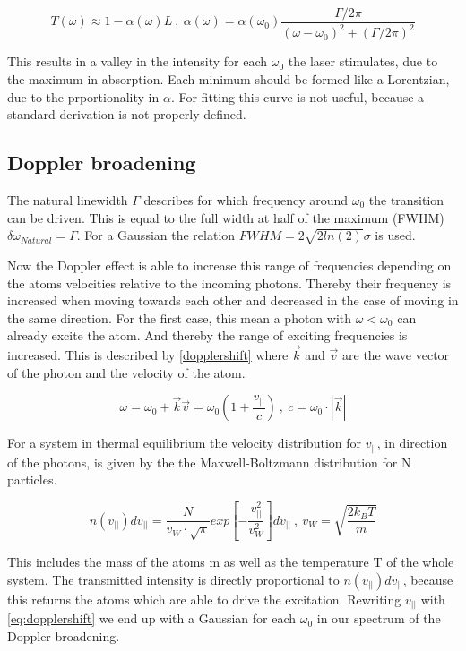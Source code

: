\documentclass[]{article}
\begin{document}
\begin{equation}
T(\omega)\approx 1-\alpha(\omega)L \:,\: \alpha(\omega)= \alpha(\omega_0)\frac{\Gamma/2\pi}{(\omega-\omega_0)^2 + (\Gamma/2\pi)^2}
\end{equation}

This results in a valley in the intensity for each $\omega_0$ the laser stimulates, due to the maximum in absorption. Each minimum should be formed like a Lorentzian, due to the prportionality in $\alpha$. For fitting this curve is not useful, because a standard derivation is not properly defined. 

\subsection{Doppler broadening}
The natural linewidth $\Gamma$ describes for which frequency around $\omega_0$ the transition can be driven. This is equal to the full width at half of the maximum (FWHM) $\delta\omega_{Natural} = \Gamma$. For a Gaussian the relation $FWHM = 2 \sqrt{2ln(2)} \sigma$ is used.

Now the Doppler effect is able to increase this range of frequencies depending on the atoms velocities relative to the incoming photons. Thereby their frequency is increased when moving towards each other and decreased in the case of moving in the same direction. For the first case, this mean a photon with $\omega < \omega_0$ can already excite the atom. And thereby the range of exciting frequencies is increased. This is described by \autoref{dopplershift} where $\vec{k}$ and $\vec{v}$ are the wave vector of the photon and the velocity of the atom.

\begin{equation}
\omega  = \omega_0 + \vec{k}\vec{v} = \omega_0 \left(1+\frac{v_{||}}{c} \right)\:,\: c = \omega_0\cdot |\vec{k}|
\label{eq:dopplershift}
\end{equation}

For a system in thermal equilibrium the velocity distribution for $v_{||}$, in direction of the photons, is given by the the Maxwell-Boltzmann distribution for N particles. 

\begin{equation}
n(v_{||})dv_{||} = \frac{N}{v_W \cdot \sqrt{\pi}} exp\left[ - \frac{v_{||}^2}{v_W^2} \right] dv_{||} \:,\: v_W= \sqrt{\frac{2k_BT}{m}}
\end{equation}

This includes the mass of the atoms m as well as the temperature T of the whole system. The transmitted intensity is directly proportional to $n(v_{||}) dv_{||}$, because this returns the atoms which are able to drive the excitation. Rewriting $v_{||}$ with \autoref{eq:dopplershift} we end up with a Gaussian for each $\omega_0$ in our spectrum of the Doppler broadening.
\end{document}
